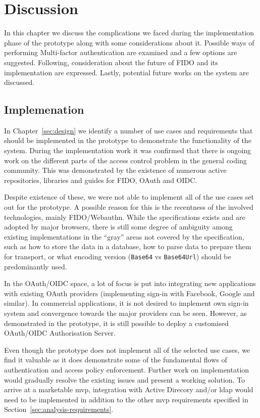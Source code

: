 \section{Discussion}\label{sec:discussion}
In this chapter we discuss the complications we faced during the implementation phase of the prototype along with some considerations about it. Possible ways of performing Multi-factor authentication are examined and a few options are suggested. Following, consideration about the future of FIDO and its implementation are expressed. Lastly, potential future works on the system are discussed.

\subsection*{Implemenation}
In Chapter~\ref{sec:design} we identify a number of use cases and requirements that should be implemented in the prototype to demonstrate the functionality of the system. During the implementation work it was confirmed that there is ongoing work on the different parts of the access control problem in the general coding community. This was demonstrated by the existence of numerous active repositories, libraries and guides for FIDO, OAuth and OIDC.

Despite existence of these, we were not able to implement all of the use cases set out for the prototype. A possible reason for this is the recentness of the involved technologies, mainly FIDO/Webauthn. While the specifications exists and are adopted by major browsers, there is still some degree of ambiguity among existing implementations in the ``gray'' areas not covered by the specification, such as how to store the data in a database, how to parse data to prepare them for transport, or what encoding version (\texttt{Base64} vs \texttt{Base64Url}) should be predominantly used.

In the OAuth/OIDC space, a lot of focus is put into integrating new applications with existing OAuth providers (implementing sign-in with Facebook, Google and similar). In commercial applications, it is not desired to implement own sign-in system and convergence towards the major providers can be seen. However, as demonstrated in the prototype, it is still possible to deploy a customised OAuth/OIDC Authorisation Server.

Even though the prototype does not implement all of the selected use cases, we find it valuable as it does demonstrate some of the fundamental flows of authentication and access policy enforcement. Further work on implementation would gradually resolve the existing issues and present a working solution. To arrive at a marketable \acrshort{mvp}, integration with Active Direcory and/or \acrshort{ldap} would need to be implemented in addition to the other \acrshort{mvp} requirements specified in Section~\ref{sec:analysis-requirements}.

